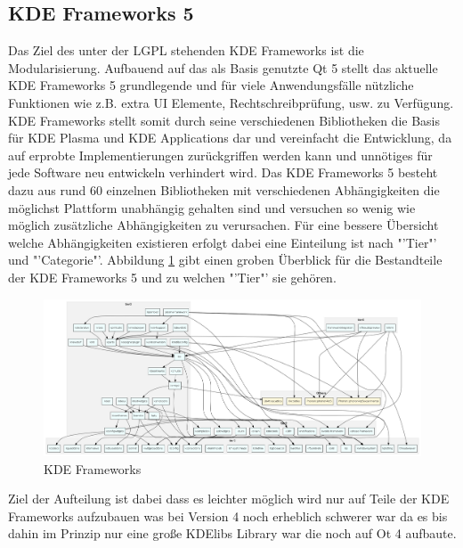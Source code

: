 \documentclass[10pt,a4paper,twocolumn]{article}
\begin{document}
\subsection{KDE Frameworks 5}
Das Ziel des unter der LGPL stehenden KDE Frameworks ist die Modularisierung. Aufbauend auf das als Basis genutzte Qt 5 stellt das aktuelle KDE Frameworks 5 grundlegende und für viele Anwendungsfälle nützliche Funktionen wie z.B. extra UI Elemente, Rechtschreibprüfung, usw. zu Verfügung. KDE Frameworks stellt somit durch seine verschiedenen Bibliotheken die Basis für KDE Plasma und KDE Applications dar und vereinfacht die Entwicklung, da auf erprobte Implementierungen zurückgriffen werden kann und unnötiges für jede Software neu entwickeln verhindert wird. Das KDE Frameworks 5 besteht dazu aus rund 60 einzelnen Bibliotheken mit verschiedenen Abhängigkeiten die möglichst Plattform unabhängig gehalten sind und versuchen so wenig wie möglich zusätzliche Abhängigkeiten zu verursachen. Für eine bessere Übersicht welche Abhängigkeiten existieren erfolgt dabei eine Einteilung ist nach "'Tier"' und "'Categorie"'. Abbildung \ref{fig:kde_frameworks} gibt einen groben Überblick für die Bestandteile der KDE Frameworks 5 und zu welchen "'Tier"' sie gehören.

\begin{figure}[h]
	\centering
	\includegraphics[width=\columnwidth]{images/kf5_big_0.png}
	\caption{KDE Frameworks}
	\label{fig:kde_frameworks}
\end{figure}

Ziel der Aufteilung ist dabei dass es leichter möglich wird nur auf Teile der KDE Frameworks aufzubauen was bei Version 4 noch erheblich schwerer war da es bis dahin im Prinzip nur eine große KDElibs Library war die noch auf Ot 4 aufbaute.
\end{document}

